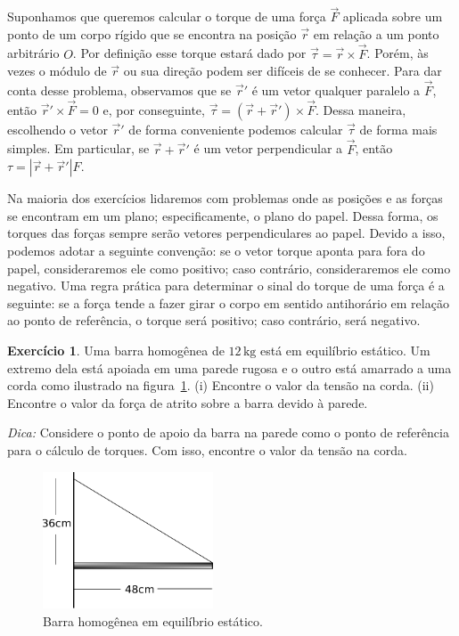 \documentclass[twocolumn=on,fontsize=12pt,DIV=calc]{scrartcl}
\theoremstyle{definition}
\newtheorem{ex}{Exercício}[section]
\begin{document}
Suponhamos que queremos calcular o torque de uma força $\vec F$
aplicada sobre um ponto de um corpo rígido que se encontra na posição
$\vec r$ em relação a um ponto arbitrário $O$. Por definição esse
torque estará dado por $\vec\tau=\vec r\times\vec F$. Porém, às vezes
o módulo de $\vec r$ ou sua direção podem ser difíceis de se
conhecer. Para dar conta desse problema, observamos que se $\vec r'$ é
um vetor qualquer paralelo a $\vec F$, então $\vec r'\times\vec F=0$
e, por conseguinte, $\vec\tau=(\vec r+\vec r')\times \vec F$. Dessa
maneira, escolhendo o vetor $\vec r'$ de forma conveniente podemos
calcular $\vec\tau$ de forma mais simples. Em particular, se
$\vec r+\vec r'$ é um vetor perpendicular a $\vec F$, então
$\tau=|\vec r+\vec r'|F$.

Na maioria dos exercícios lidaremos com problemas onde as posições e
as forças se encontram em um plano; especificamente, o plano do
papel. Dessa forma, os torques das forças sempre serão vetores
perpendiculares ao papel. Devido a isso, podemos adotar a seguinte
convenção: se o vetor torque aponta para fora do papel, consideraremos
ele como positivo; caso contrário, consideraremos ele como
negativo. Uma regra prática para determinar o sinal do torque de uma
força é a seguinte: se a força tende a fazer girar o corpo em sentido
antihorário em relação ao ponto de referência, o torque será positivo;
caso contrário, será negativo.

\begin{ex}
  Uma barra homogênea de $12\,\mathrm{kg}$ está em equilíbrio
  estático. Um extremo dela está apoiada em uma parede rugosa e o
  outro está amarrado a uma corda como ilustrado na
  figura~\ref{fig:barra_equilibrio}. (i) Encontre o valor da tensão na
  corda. (ii) Encontre o valor da força de atrito sobre a barra devido
  à parede.

  \noindent\textit{Dica:} Considere o ponto de apoio da barra na parede como o ponto de referência para o cálculo de torques. Com isso, encontre o valor da tensão na corda.
  \begin{figure}[ht]
    \centering
    \includegraphics[width=0.45\textwidth,keepaspectratio]{aux/barra_equilibrio.pdf}
    \caption{Barra homogênea em equilíbrio es\-tá\-ti\-co.}
    \label{fig:barra_equilibrio}
  \end{figure}
\end{ex}
\end{document}
